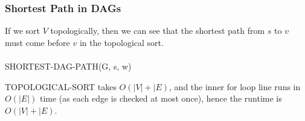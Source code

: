\documentclass{article}
\begin{document}
        \subsubsection{Shortest Path in DAGs}
            If we sort $V$ topologically, then we can see that the shortest path from $s$ to $v$ must come before $v$ in the topological sort. \\ \\
            SHORTEST-DAG-PATH(G, s, w)
            \begin{algorithmic}[1]
                \EndFor
                        \EndIf
                    \EndFor
                \EndFor
            \end{algorithmic}
            TOPOLOGICAL-SORT takes $O(|V| + |E)$, and the inner for loop line runs in $O(|E|)$ time (as each edge is checked at most once), hence the runtime is $O(|V| + |E)$.
\end{document}
